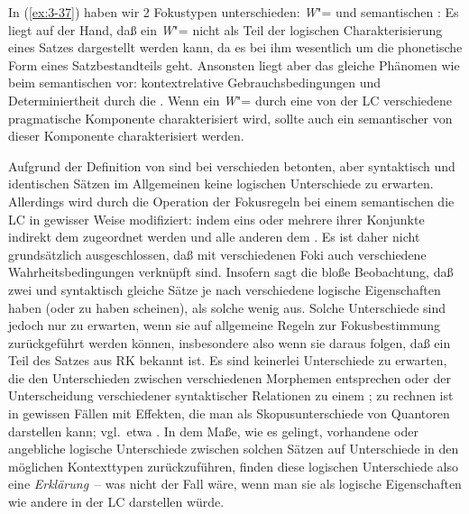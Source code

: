 \documentclass[output=paper]{langsci/langscibook}
\begin{document}
  In (\ref{ex:3-37}) haben wir 2 Fokustypen unterschieden: \textit{W}"= und
  semantischen : Es liegt auf der Hand, daß ein \textit{W}"= nicht
  als Teil der logischen Charakterisierung eines Satzes dargestellt
  werden kann, da es bei ihm wesentlich um die phonetische Form eines
  Satzbestandteils geht. Ansonsten liegt aber das gleiche Phänomen wie
  beim semantischen  vor: kontextrelative Gebrauchsbedingungen
  und Determiniertheit durch die . Wenn ein \textit{W}"= durch
  eine von der LC verschiedene pragmatische Komponente charakterisiert
  wird, sollte auch ein semantischer  von dieser Komponente
  charakterisiert werden.

\addlines[2]
  Aufgrund der Definition von  sind bei verschieden
  betonten, aber syntaktisch und  identischen Sätzen
  im Allgemeinen keine logischen Unterschiede zu erwarten. Allerdings wird
  durch die Operation der Fokusregeln bei einem semantischen  die
  LC in gewisser Weise modifiziert: indem eins oder mehrere ihrer
  Konjunkte indirekt dem  zugeordnet werden und alle anderen dem
  . Es ist daher nicht grundsätzlich ausgeschlossen, daß mit
  verschiedenen Foki auch verschiedene Wahrheitsbedingungen verknüpft
  sind. Insofern sagt die bloße Beobachtung, daß zwei 
  und syntaktisch gleiche Sätze je nach  verschiedene logische
  Eigenschaften haben (oder zu haben scheinen), als solche wenig
  aus. Solche Unterschiede sind jedoch nur zu erwarten, wenn sie auf
  allgemeine Regeln zur Fokusbestimmung zurückgeführt werden können,
  insbesondere also wenn sie daraus folgen, daß ein Teil des Satzes
  aus RK bekannt ist. Es sind keinerlei Unterschiede zu erwarten, die
  den Unterschieden zwischen verschiedenen Morphemen entsprechen oder
  der Unterscheidung verschiedener syntaktischer Relationen zu einem
  ; zu rechnen ist in gewissen Fällen \zb mit Effekten, die man
  als Skopusunterschiede von Quantoren darstellen kann; vgl.\ etwa
  \citet[45]{Rochemont78}. In dem Maße, wie es gelingt, vorhandene oder
  angebliche logische Unterschiede zwischen solchen Sätzen auf
  Unterschiede in den möglichen Kontexttypen zurückzuführen, finden
  diese logischen Unterschiede also eine \textit{Erklärung}~-- was nicht der
  Fall wäre, wenn man sie als logische Eigenschaften wie andere in der
  LC darstellen würde.
\end{document}
